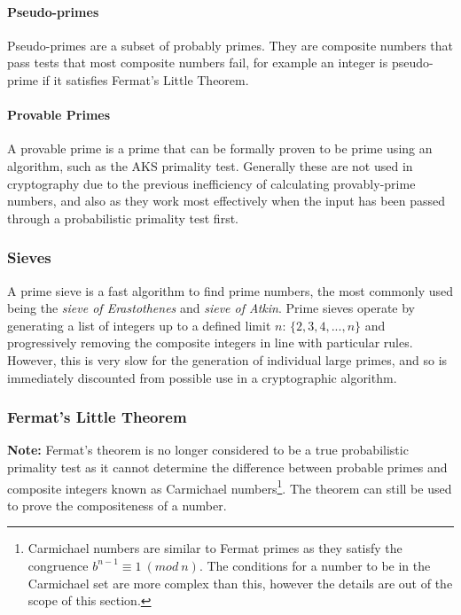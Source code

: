       \paragraph{Pseudo-primes}
      
      Pseudo-primes are a subset of probably primes. They are composite numbers that pass tests that most composite numbers fail, for example an integer is pseudo-prime if it satisfies Fermat's Little Theorem.
      
      \paragraph{Provable Primes}
      
      A provable prime is a prime that can be formally proven to be prime using an algorithm, such as the AKS primality test. Generally these are not used in cryptography due to the previous inefficiency of calculating provably-prime numbers, and also as they work most effectively when the input has been passed through a probabilistic primality test first.
  
    \subsubsection{Sieves}
    
    A prime sieve is a fast algorithm to find prime numbers, the most commonly used being the \emph{sieve of Erastothenes} and \emph{sieve of Atkin}. Prime sieves operate by generating a list of integers up to a defined limit $n$: $\{2,3,4,...,n\}$ and progressively removing the composite integers in line with particular rules. However, this is very slow for the generation of individual large primes, and so is immediately discounted from possible use in a cryptographic algorithm.
    
    \subsubsection{Fermat's Little Theorem}
    
    \textbf{Note:} Fermat's theorem is no longer considered to be a true probabilistic primality test as it cannot determine the difference between probable primes and composite integers known as Carmichael numbers\footnote{Carmichael numbers are similar to Fermat primes as they satisfy the congruence $b^{n-1} \equiv 1 \ (mod \ n)$. The conditions for a number to be in the Carmichael set are more complex than this, however the details are out of the scope of this section.}. The theorem can still be used to prove the compositeness of a number.
    
